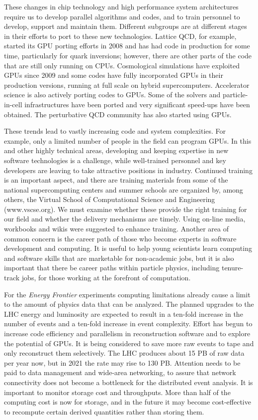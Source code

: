These changes in chip technology and high performance system architectures
require us to develop parallel algorithms and codes, and to train personnel
to develop, support and maintain them. Different subgroups are at different
stages in their efforts to port to these new technologies. Lattice QCD, for
example, started its GPU porting efforts in 2008 and has had code in
production for some time, particularly for quark inversions; however, there
are other parts of the code that are still only running on CPUs.
Cosmological simulations have exploited GPUs since 2009 and some 
codes have fully incorporated GPUs in their production versions, running 
at full scale on hybrid supercomputers.
Accelerator science is also actively porting codes to GPUs. Some of the
solvers and particle-in-cell infrastructures have been ported and very
significant speed-ups have been obtained. The perturbative QCD community
has also started using GPUs.

These trends lead to vastly increasing code and system complexities. For
example, only a limited number of people in the field can program GPUs. In
this and other highly technical areas, developing and keeping expertise in
new software technologies is a challenge, while well-trained personnel and
key developers are leaving to take attractive positions in industry.
Continued training is an important aspect, and there are training materials
from some of the national supercomputing centers and summer schools are
organized by, among others, the Virtual School of Computational Science and
Engineering (www.vscse.org). We must examine whether these provide the
right training for our field and whether the delivery mechanisms are
timely. Using on-line media, workbooks and wikis were suggested to enhance
training. Another area of common concern is the career path of those who
become experts in software development and computing. It is useful to help
young scientists learn computing and software skills that are marketable
for non-academic jobs, but it is also important that there be career paths
within particle physics, including tenure-track jobs, for those working at
the forefront of computation.

For the {\it Energy Frontier} experiments computing limitations already
cause a limit to the amount of physics data that can be analyzed. The
planned upgrades to the LHC energy and luminosity are expected to result in
a ten-fold increase in the number of events and a ten-fold increase in
event complexity. Effort has begun to increase code efficiency and
parallelism in reconstruction software and to explore the potential of
GPUs. It is being considered to save more raw events to tape and only
reconstruct them selectively. The LHC produces about 15 PB of raw data per
year now, but in 2021 the rate may rise to 130 PB. Attention needs to be
paid to data management and wide-area networking, to assure that network
connectivity does not become a bottleneck for the distributed event
analysis. It is important to monitor storage cost and throughputs. More
than half of the computing cost is now for storage, and in the future it
may become cost-effective to recompute certain derived quantities rather
than storing them.

